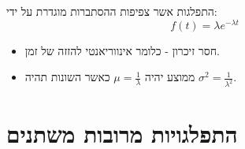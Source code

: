 \documentclass{tstextbook}
\begin{document}
\begin{definition}
התפלגות אשר צפיפות ההסתברות מוגדרת על ידי:
$$f(t)=\lambda e^{-\lambda t}$$

\end{definition}
\begin{proposition}
  \begin{itemize}
    \item חסר זיכרון - כלומר אינווריאנטי להזזה של זמן.
    \item ממוצע יהיה \(\mu =\frac{1}{\lambda}\) כאשר השונות תהיה \(\sigma^{2}=\frac{1}{\lambda^{2}}\).
  \end{itemize}
\end{proposition}
\begin{definition}
\end{definition}
\section{התפלגויות מרובות משתנים}
\end{document}
